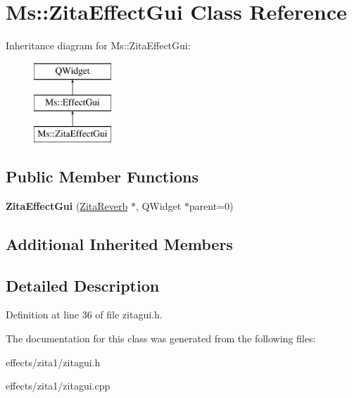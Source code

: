 \hypertarget{class_ms_1_1_zita_effect_gui}{}\section{Ms\+:\+:Zita\+Effect\+Gui Class Reference}
\label{class_ms_1_1_zita_effect_gui}
Inheritance diagram for Ms\+:\+:Zita\+Effect\+Gui\+:\begin{figure}[H]
\begin{center}
\leavevmode
\includegraphics[height=3.000000cm]{class_ms_1_1_zita_effect_gui}
\end{center}
\end{figure}
\subsection*{Public Member Functions}
\begin{DoxyCompactItemize}
\item 
\mbox{\label{class_ms_1_1_zita_effect_gui_a9e50b4f6afd3e517718581c1db08cc4a}} 
{\bfseries Zita\+Effect\+Gui} (\hyperlink{class_ms_1_1_zita_reverb}{Zita\+Reverb} $\ast$, Q\+Widget $\ast$parent=0)
\end{DoxyCompactItemize}
\subsection*{Additional Inherited Members}


\subsection{Detailed Description}


Definition at line 36 of file zitagui.\+h.



The documentation for this class was generated from the following files\+:\begin{DoxyCompactItemize}
\item 
effects/zita1/zitagui.\+h\item 
effects/zita1/zitagui.\+cpp\end{DoxyCompactItemize}
